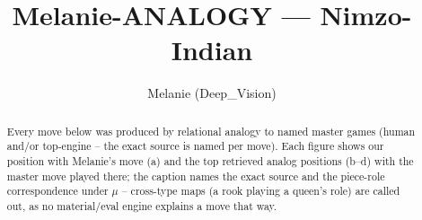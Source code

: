 \documentclass[11pt]{article}
\title{Melanie-ANALOGY — Nimzo-Indian}
\author{Melanie (Deep\_Vision)}
\date{}
\begin{document}
\maketitle

\begin{abstract}Every move below was produced by relational analogy to named master games (human and/or top-engine -- the exact source is named per move). Each figure shows our position with Melanie's move (a) and the top retrieved analog positions (b--d) with the master move played there; the caption names the exact source and the piece-role correspondence under $\mu$ -- cross-type maps (a rook playing a queen's role) are called out, as no material/eval engine explains a move that way.\end{abstract}

\begin{figure}[p]\centering
\begin{subfigure}{0.46\textwidth}\centering
\resizebox{\linewidth}{!}{%
\newchessgame
\chessboard[
  setfen={rnbq1rk1/pp3ppp/4pn2/2pp4/1bPP4/2NBPN2/PP3PPP/R1BQK2R w KQ - 0 7},
  showmover=false,
  pgfstyle=straightmove, color=movearrow, markmove={e1-g1}
]}
\caption{}
\end{subfigure}\hfill
\begin{subfigure}{0.46\textwidth}\centering
\resizebox{\linewidth}{!}{%
\newchessgame
\chessboard[
  setfen={rnbq1rk1/pp3ppp/4pn2/2pp4/1bPP4/2NBPN2/PP3PPP/R1BQK2R w KQ - 0 7},
  showmover=false,
  pgfstyle=straightmove, color=movearrow, markmove={e1-g1}
]}
\caption{}
\end{subfigure}
\\[4pt]
\begin{subfigure}{0.46\textwidth}\centering
\resizebox{\linewidth}{!}{%
\newchessgame
\chessboard[
  setfen={rnbq1rk1/pp3ppp/4pn2/2pp4/1bPP4/2NBPN2/PP3PPP/R1BQK2R w KQ - 0 7},
  showmover=false,
  pgfstyle=straightmove, color=movearrow, markmove={e1-g1}
]}
\caption{}
\end{subfigure}\hfill
\begin{subfigure}{0.46\textwidth}\centering
\resizebox{\linewidth}{!}{%
\newchessgame
\chessboard[
  setfen={rnbq1rk1/pp3ppp/4pn2/2pp4/1bPP4/2NBPN2/PP3PPP/R1BQK2R w KQ - 0 7},
  showmover=false,
  pgfstyle=straightmove, color=movearrow, markmove={e1-g1}
]}
\caption{}
\end{subfigure}

\end{figure}
\end{document}
